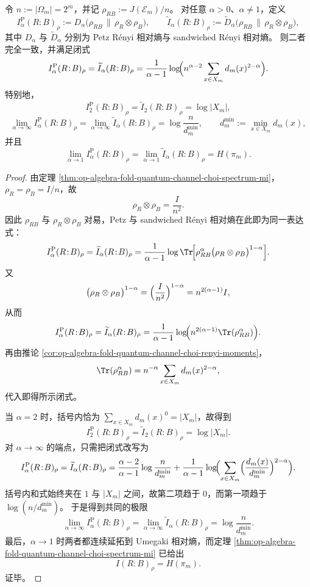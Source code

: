 \begin{theorem}\label{thm:op-algebra-fold-quantum-channel-choi-renyi-mutual-information}
令 \(n:=|\Omega_m|=2^m\)，并记 \(\rho_{RB}:=J(\mathcal{E}_m)/n\)。
对任意 \(\alpha>0\)、\(\alpha\neq 1\)，定义
\[
I_\alpha^{\mathrm P}(R\!:\!B)_\rho
:=
D_\alpha\!\bigl(\rho_{RB}\,\|\,\rho_R\otimes\rho_B\bigr),
\qquad
\widetilde I_\alpha(R\!:\!B)_\rho
:=
\widetilde D_\alpha\!\bigl(\rho_{RB}\,\|\,\rho_R\otimes\rho_B\bigr),
\]
其中 \(D_\alpha\) 与 \(\widetilde D_\alpha\) 分别为 Petz Rényi 相对熵与 sandwiched Rényi 相对熵。
则二者完全一致，并满足闭式
\[
I_\alpha^{\mathrm P}(R\!:\!B)_\rho
=
\widetilde I_\alpha(R\!:\!B)_\rho
=
\frac{1}{\alpha-1}\log\!\Bigl(
n^{\alpha-2}\sum_{x\in X_m} d_m(x)^{2-\alpha}
\Bigr).
\]
特别地，
\[
I_2^{\mathrm P}(R\!:\!B)_\rho
=
\widetilde I_2(R\!:\!B)_\rho
=
\log|X_m|,
\]
\[
\lim_{\alpha\to\infty}I_\alpha^{\mathrm P}(R\!:\!B)_\rho
=
\lim_{\alpha\to\infty}\widetilde I_\alpha(R\!:\!B)_\rho
=
\log\frac{n}{d_m^{\min}},
\qquad
d_m^{\min}:=\min_{x\in X_m}d_m(x),
\]
并且
\[
\lim_{\alpha\to1}I_\alpha^{\mathrm P}(R\!:\!B)_\rho
=
\lim_{\alpha\to1}\widetilde I_\alpha(R\!:\!B)_\rho
=
H(\pi_m).
\]
\end{theorem}
\begin{proof}
由定理 \ref{thm:op-algebra-fold-quantum-channel-choi-spectrum-mi}，\(\rho_R=\rho_B=I/n\)，故
\[
\rho_R\otimes\rho_B=\frac{I}{n^2}.
\]
因此 \(\rho_{RB}\) 与 \(\rho_R\otimes\rho_B\) 对易，Petz 与 sandwiched Rényi 相对熵在此即为同一表达式：
\[
I_\alpha^{\mathrm P}(R\!:\!B)_\rho
=
\widetilde I_\alpha(R\!:\!B)_\rho
=
\frac{1}{\alpha-1}
\log\Tr\!\Bigl[
\rho_{RB}^{\alpha}\bigl(\rho_R\otimes\rho_B\bigr)^{1-\alpha}
\Bigr].
\]
又
\[
\bigl(\rho_R\otimes\rho_B\bigr)^{1-\alpha}
=
\Bigl(\frac{I}{n^2}\Bigr)^{1-\alpha}
=
n^{2(\alpha-1)}I,
\]
从而
\[
I_\alpha^{\mathrm P}(R\!:\!B)_\rho
=
\widetilde I_\alpha(R\!:\!B)_\rho
=
\frac{1}{\alpha-1}
\log\!\Bigl(n^{2(\alpha-1)}\Tr(\rho_{RB}^\alpha)\Bigr).
\]
再由推论 \ref{cor:op-algebra-fold-quantum-channel-choi-renyi-moments}，
\[
\Tr(\rho_{RB}^\alpha)=n^{-\alpha}\sum_{x\in X_m} d_m(x)^{2-\alpha},
\]
代入即得所示闭式。

当 \(\alpha=2\) 时，括号内恰为
\(
\sum_{x\in X_m}d_m(x)^0=|X_m|
\)，故得到
\[
I_2^{\mathrm P}(R\!:\!B)_\rho
=
\widetilde I_2(R\!:\!B)_\rho
=
\log|X_m|.
\]
对 \(\alpha\to\infty\) 的端点，只需把闭式改写为
\[
I_\alpha^{\mathrm P}(R\!:\!B)_\rho
=
\widetilde I_\alpha(R\!:\!B)_\rho
=
\frac{\alpha-2}{\alpha-1}\log\frac{n}{d_m^{\min}}
+
\frac{1}{\alpha-1}
\log\!\Bigl(
\sum_{x\in X_m}\Bigl(\frac{d_m(x)}{d_m^{\min}}\Bigr)^{2-\alpha}
\Bigr).
\]
括号内和式始终夹在 \(1\) 与 \(|X_m|\) 之间，故第二项趋于 \(0\)，而第一项趋于 \(\log(n/d_m^{\min})\)。
于是得到共同的极限
\[
\lim_{\alpha\to\infty}I_\alpha^{\mathrm P}(R\!:\!B)_\rho
=
\lim_{\alpha\to\infty}\widetilde I_\alpha(R\!:\!B)_\rho
=
\log\frac{n}{d_m^{\min}}.
\]
最后，\(\alpha\to1\) 时两者都连续延拓到 Umegaki 相对熵，而定理 \ref{thm:op-algebra-fold-quantum-channel-choi-spectrum-mi} 已给出
\[
I(R\!:\!B)_\rho=H(\pi_m).
\]
证毕。
\end{proof}

